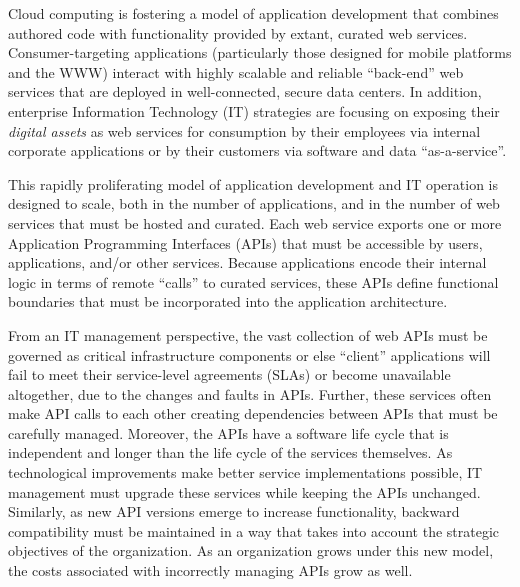Cloud computing is fostering a model of 
application development that combines authored code with functionality
provided by extant, curated web services.  Consumer-targeting applications 
(particularly those designed for mobile platforms and the WWW) interact with highly
scalable and reliable ``back-end'' web services that are deployed
in well-connected, secure data centers.  In addition, enterprise
Information Technology (IT) strategies are focusing on 
exposing their {\em digital assets} as
web services for consumption
by their employees via internal corporate applications or
by their customers via software and data ``as-a-service''.

This rapidly proliferating model of application development and IT operation
is designed to scale, both in the number of applications, 
and in the number of web services that must be
hosted and curated.  Each web service exports one or more Application Programming
Interfaces (APIs) that must be accessible by users, applications, and/or
other services.
Because applications encode their internal logic in terms of
remote ``calls'' to curated services,
these APIs define functional boundaries that must be incorporated into the
application architecture.  


From an IT management perspective, the vast collection of web APIs must be
governed as critical infrastructure components or else ``client'' applications
will fail to meet their service-level agreements (SLAs)
or become unavailable altogether, due to the changes and faults in APIs.  
Further, these services often make API calls to each other 
creating dependencies between APIs that must be carefully managed.
Moreover, the APIs have a software life cycle that is
independent and longer than the life cycle of the services themselves. 
As technological improvements make better service implementations possible, IT
management must upgrade these services while keeping the APIs unchanged.
Similarly, as new API versions emerge to increase functionality, backward
compatibility must be maintained in a way that takes into
account the strategic objectives of the organization.  As an organization
grows under this new model, the costs associated with
incorrectly managing APIs grow as well.

